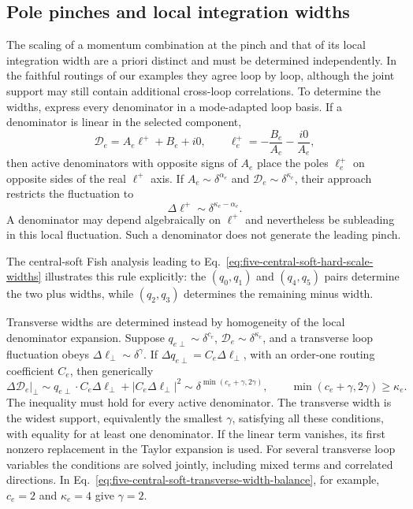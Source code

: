 \documentclass[a4paper,11pt]{article}
\begin{document}
\subsection{Pole pinches and local integration widths}
\label{sec:pole-pinches-local-widths}

The scaling of a momentum combination at the pinch and that of its local
integration width are a priori distinct and must be determined independently.
In the faithful routings of our examples they agree loop by loop, although the
joint support may still contain additional cross-loop correlations.  To
determine the widths, express every denominator in a mode-adapted loop basis.
If a denominator is linear in the selected component,
\begin{equation}
 \mathcal D_e=A_e\ell^+ +B_e+i0,
 \qquad
 \ell_e^+=-\frac{B_e}{A_e}-\frac{i0}{A_e},
 \label{eq:light-cone-pole-rule}
\end{equation}
then active denominators with opposite signs of \(A_e\) place the poles
\(\ell_e^+\) on opposite sides of the real \(\ell^+\) axis.  If
\(A_e\sim\delta^{\alpha_e}\) and
\(\mathcal D_e\sim\delta^{\kappa_e}\), their approach restricts the
fluctuation to
\begin{equation}
 \Delta\ell^+\sim\delta^{\kappa_e-\alpha_e}.
 \label{eq:light-cone-pinch-width}
\end{equation}
A denominator may depend algebraically on \(\ell^+\) and nevertheless be
subleading in this local fluctuation.  Such a denominator does not generate
the leading pinch.

The central-soft Fish analysis leading to
Eq.~\eqref{eq:five-central-soft-hard-scale-widths} illustrates this rule
explicitly: the \((q_0,q_1)\) and \((q_4,q_5)\) pairs determine the two plus
widths, while \((q_2,q_3)\) determines the remaining minus width.

Transverse widths are determined instead by homogeneity of the local
denominator expansion.  Suppose
\(q_{e\perp}\sim\delta^{c_e}\),
\(\mathcal D_e\sim\delta^{\kappa_e}\), and a transverse loop fluctuation
obeys \(\Delta\ell_\perp\sim\delta^\gamma\).  If
\(\Delta q_{e\perp}=C_e\Delta\ell_\perp\), with an order-one routing
coefficient \(C_e\), then generically
\begin{equation}
 \left.\Delta\mathcal D_e\right|_\perp
 \sim q_{e\perp}\mathbin\cdot C_e\Delta\ell_\perp
      +|C_e\Delta\ell_\perp|^2
 \sim\delta^{\min(c_e+\gamma,2\gamma)},
 \qquad
 \min(c_e+\gamma,2\gamma)\geq\kappa_e.
 \label{eq:transverse-width-homogeneity}
\end{equation}
The inequality must hold for every active denominator.  The transverse width
is the widest support, equivalently the smallest \(\gamma\), satisfying all
these conditions, with equality for at least one denominator.  If the linear
term vanishes, its first nonzero replacement in the Taylor expansion is used.
For several transverse loop variables the conditions are solved jointly,
including mixed terms and correlated directions.  In
Eq.~\eqref{eq:five-central-soft-transverse-width-balance}, for example,
\(c_e=2\) and \(\kappa_e=4\) give \(\gamma=2\).
\end{document}

